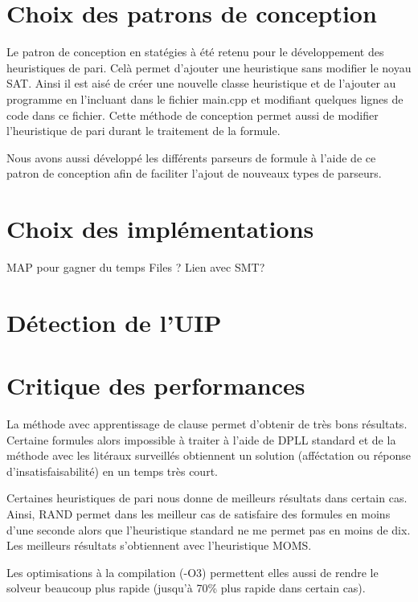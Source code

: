 \documentclass{article}
\begin{document}
\section{Choix des patrons de conception}
Le patron de conception en statégies à été retenu pour le développement des heuristiques de pari. Celà permet d'ajouter une heuristique sans modifier le noyau SAT. Ainsi il est aisé de créer une nouvelle classe heuristique et de l'ajouter au programme en l'incluant dans le fichier main.cpp et modifiant quelques lignes de code dans ce fichier.
Cette méthode de conception permet aussi de modifier l'heuristique de pari durant le traitement de la formule.

Nous avons aussi développé les différents parseurs de formule à l'aide de ce patron de conception afin de faciliter l'ajout de nouveaux types de parseurs.
\section{Choix des implémentations}
MAP pour gagner du temps
Files ?
Lien avec SMT?

\section{Détection de l'UIP}

\section{Critique des performances}
La méthode avec apprentissage de clause permet d'obtenir de très bons résultats. Certaine formules alors impossible à traiter à l'aide de DPLL standard et de la méthode avec les litéraux surveillés obtiennent un solution (afféctation ou réponse d'insatisfaisabilité) en un temps très court.

Certaines heuristiques de pari nous donne de meilleurs résultats dans certain cas. Ainsi, RAND permet dans les meilleur cas de satisfaire des formules en moins d'une seconde alors que l'heuristique standard ne me permet pas en moins de dix. Les meilleurs résultats s'obtiennent avec l'heuristique MOMS.

Les optimisations à la compilation (-O3) permettent elles aussi de rendre le solveur beaucoup plus rapide (jusqu'à 70\% plus rapide dans certain cas).



\end{document}

